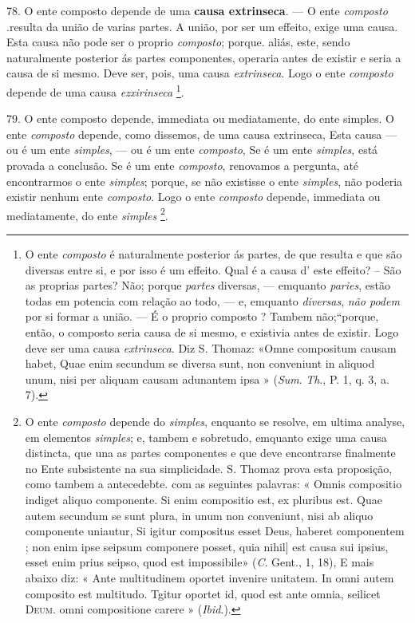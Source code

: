 78. O ente composto depende de uma \textbf{causa extrinseca}. --- O ente \emph{composto} .resulta da união de varias partes. A união, por ser um effeito, exige uma causa. Esta causa não pode ser o proprio \emph{composto}; porque. aliás, este, sendo naturalmente posterior ás partes componentes, operaria antes de existir e seria a causa de si mesmo. Deve ser, pois, uma causa \emph{extrinseca}. Logo o ente \emph{composto} depende de uma causa \emph{ezxirinseca} \footnote{O ente \emph{composto} é naturalmente posterior ás partes, de que resulta e que são diversas entre si, e por isso é um effeito. Qual é a causa d' este effeito? -- São as proprias partes? Não; porque \emph{partes} diversas, --- emquanto \emph{paries}, estão todas em potencia com relação ao todo, --- e, emquanto \emph{diversas}, \emph{não podem} por si formar a união. --- É o proprio composto ? Tambem não;“porque, então, o composto seria causa de si mesmo, e existivia antes de existir. Logo deve ser uma causa \emph{extrinseca}. Diz S. Thomaz: «Omne compositum causam habet, Quae enim secundum se diversa sunt, non conveniunt in aliquod unum, nisi per aliquam causam adunantem ipsa » (\emph{Sum}. \emph{Th}., P. 1, q. 3, a. 7).}.

 79. O ente composto depende, immediata ou mediatamente, do ente simples. O ente \emph{composto} depende, como dissemos, de uma causa extrinseca, Esta causa --- ou é um ente \emph{simples}, --- ou é um ente \emph{composto}, Se é um ente \emph{simples}, está provada a conclusão. Se é um ente \emph{composto}, renovamos a pergunta, até encontrarmos o ente \emph{simples}; porque, se não existisse o ente \emph{simples}, não poderia existir nenhum ente \emph{composto}. Logo o ente \emph{composto} depende, immediata ou mediatamente, do ente \emph{simples} \footnote{O ente \emph{composto} depende do \emph{simples}, enquanto se resolve, em ultima analyse, em elementos \emph{simples}; e, tambem e sobretudo, emquanto exige uma causa distincta, que una as partes componentes e que deve encontrarse finalmente no Ente subsistente na sua simplicidade. S. Thomaz prova esta proposição, como tambem a antecedebte. com as seguintes palavras: « Omnis compositio indiget aliquo componente. Si enim compositio est, ex pluribus est. Quae autem secundum se sunt plura, in unum non conveniunt, nisi ab aliquo componente uniautur, Si igitur compositus esset Deus, haberet componentem ; non enim ipse seipsum componere posset, quia nihil] est causa sui ipsius, esset enim prius seipso, quod est impossibile» (\emph{C}. Gent., 1, 18), E mais abaixo diz: « Ante multitudinem oportet invenire unitatem. In omni autem composito est multitudo. Tgitur oportet id, quod est ante omnia, seilicet \textsc{Deum}. omni compositione carere » (\emph{Ibid}.).}.

